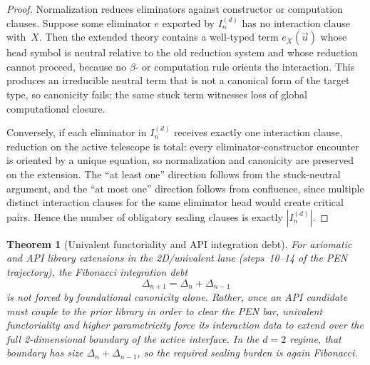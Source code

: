 \documentclass[11pt,a4paper]{article}
\theoremstyle{plain}
\newtheorem{theorem}{Theorem}[section]
\theoremstyle{definition}
\theoremstyle{remark}
\begin{document}
\begin{proof}
Normalization reduces eliminators against constructor or computation clauses.
Suppose some eliminator $e$ exported by $I_n^{(d)}$ has no interaction clause with~$X$.
Then the extended theory contains a well-typed term $e_X(\vec{u})$ whose head symbol is neutral relative to the old reduction system and whose reduction cannot proceed, because no $\beta$- or computation rule orients the interaction.
This produces an irreducible neutral term that is not a canonical form of the target type, so canonicity fails; the same stuck term witnesses loss of global computational closure.

Conversely, if each eliminator in $I_n^{(d)}$ receives exactly one interaction clause, reduction on the active telescope is total: every eliminator-constructor encounter is oriented by a unique equation, so normalization and canonicity are preserved on the extension.
The ``at least one'' direction follows from the stuck-neutral argument, and the ``at most one'' direction follows from confluence, since multiple distinct interaction clauses for the same eliminator head would create critical pairs.
Hence the number of obligatory sealing clauses is exactly $|I_n^{(d)}|$.
\end{proof}

\begin{theorem}[Univalent functoriality and API integration debt]
\label{thm:univalent-functoriality}
For axiomatic and API library extensions in the 2D/univalent lane (steps~10--14 of the PEN trajectory), the Fibonacci integration debt
\[
  \Delta_{n+1} = \Delta_n + \Delta_{n-1}
\]
is not forced by foundational canonicity alone.
Rather, once an API candidate must couple to the prior library in order to clear the PEN bar, univalent functoriality and higher parametricity force its interaction data to extend over the full 2-dimensional boundary of the active interface.
In the $d=2$ regime, that boundary has size $\Delta_n + \Delta_{n-1}$, so the required sealing burden is again Fibonacci.
\end{theorem}
\end{document}
